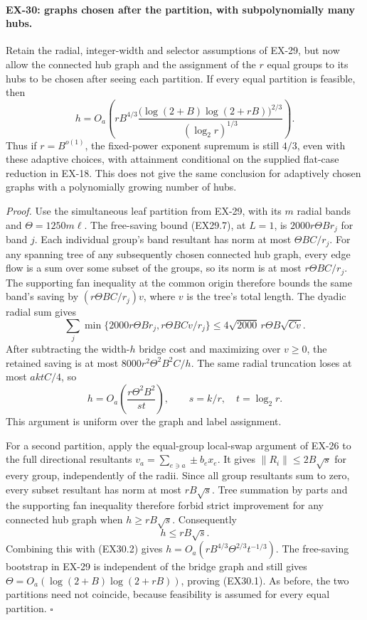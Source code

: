 \paragraph{EX-30: graphs chosen after the partition, with subpolynomially many hubs.}
Retain the radial, integer-width and selector assumptions of
EX-29, but now allow the connected hub graph and the assignment
of the $r$ equal groups to its hubs to be chosen after seeing
each partition. If every equal partition is feasible, then
\[
 h=O_a\!\left(
 rB^{4/3}
 \frac{\bigl(\log(2+B)\log(2+rB)\bigr)^{2/3}}
      {(\log_2r)^{1/3}}\right).
 \tag{EX30.1}
\]
Thus if $r=B^{o(1)}$, the fixed-power exponent supremum is
still $4/3$, even with these adaptive choices, with attainment
conditional on the supplied flat-case reduction in EX-18. This does not
give the same conclusion for adaptively chosen graphs with
a polynomially growing number of hubs.

\emph{Proof.}
Use the simultaneous leaf partition from EX-29, with its
$m$ radial bands and $\Theta=1250m\ell$.
The free-saving bound (EX29.7), at $L=1$, is
$2000r\Theta Br_j$ for band $j$.
Each individual group's band resultant has norm at most
$\Theta BC/r_j$. For any spanning tree of any subsequently
chosen connected hub graph, every edge flow is a sum over
some subset of the groups, so its norm is at most
$r\Theta BC/r_j$. The supporting fan inequality at the
common origin therefore bounds the same band's saving by
$(r\Theta BC/r_j)v$, where $v$ is the tree's total length.
The dyadic radial sum gives
\[
 \sum_j\min\{2000r\Theta Br_j,
                    r\Theta BCv/r_j\}
 \le4\sqrt{2000}\,r\Theta B\sqrt{Cv}.
\]
After subtracting the width-$h$ bridge cost and maximizing
over $v\ge0$, the retained saving is at most
$8000r^2\Theta^2B^2C/h$.
The same radial truncation loses at most $aktC/4$, so
\[
 h=O_a\!\left(\frac{r\Theta^2B^2}{st}\right),
 \qquad s=k/r,\quad t=\log_2r.
 \tag{EX30.2}
\]
This argument is uniform over the graph and label assignment.

For a second partition, apply the equal-group local-swap
argument of EX-26 to the full directional resultants
$v_a=\sum_{e\ni a}\pm b_ex_e$. It gives
$\|R_i\|\le2B\sqrt s$ for every group, independently
of the radii. Since all group resultants sum to zero,
every subset resultant has norm at most $rB\sqrt s$.
Tree summation by parts and the supporting fan inequality
therefore forbid strict improvement for any connected hub
graph when $h\ge rB\sqrt s$. Consequently
\[
 h\le rB\sqrt s.
\]
Combining this with (EX30.2) gives
$h=O_a(rB^{4/3}\Theta^{2/3}t^{-1/3})$.
The free-saving bootstrap in EX-29 is independent of the
bridge graph and still gives
$\Theta=O_a(\log(2+B)\log(2+rB))$, proving (EX30.1).
As before, the two partitions need not coincide, because
feasibility is assumed for every equal partition.
\hfill$\square$

